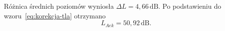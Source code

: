 Różnica średnich poziomów wyniosła $\Delta L=4,66\,\mathrm{dB}$.
Po podstawieniu do wzoru~\eqref{eq:korekcja-tla} otrzymano
\begin{equation}
 L_{Aek}=50,92\,\mathrm{dB}.
\end{equation}

